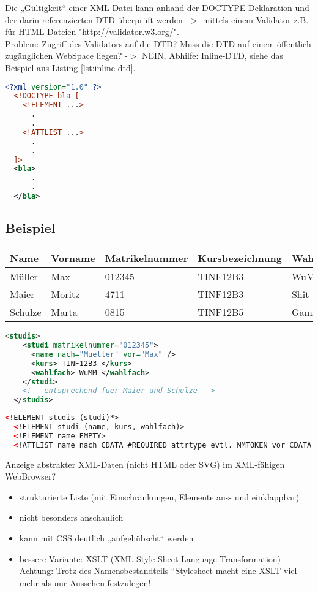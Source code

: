 \newpage
Die „Gültigkeit“ einer XML-Datei kann anhand der DOCTYPE-Deklaration und der darin referenzierten DTD überprüft werden -$>$ mittels einem Validator z.B. für HTML-Dateien "http://validator.w3.org/".\\
Problem: Zugriff des Validators auf die DTD? Muss die DTD auf einem öffentlich zugänglichen WebSpace liegen? -$>$ NEIN, Abhilfe: Inline-DTD, siehe das Beispiel aus Listing \vref{lst:inline-dtd}.
\begin{lstlisting}[caption={Inline-DTD Beispiel}, label={lst:inline-dtd}, language={XML}]
  <?xml version="1.0" ?>
  <!DOCTYPE bla [
    <!ELEMENT ...>
      .
      .
    <!ATTLIST ...>
      .
      .
  ]>
  <bla>
      .     
      .
  </bla> 
\end{lstlisting}

\newpage
\subsection{Beispiel}
\begin{tabular}{l|l|l|l|l}
\textbf{Name}	& \textbf{Vorname}	& \textbf{Matrikelnummer}	& \textbf{Kursbezeichnung}	& \textbf{Wahlfach}\\\hline
Müller	& Max		& 012345	& TINF12B3	& WuMBasis\\
Maier	& Moritz	& 4711		& TINF12B3	& Shit\\
Schulze	& Marta		& 0815		& TINF12B5	& Gaming\\
\end{tabular}	

\begin{lstlisting}[caption={Listeneinträge}, label={lst:inline-dtd}, language={XML}]
  <studis>
    <studi matrikelnummer="012345">
      <name nach="Mueller" vor="Max" />
      <kurs> TINF12B3 </kurs>
      <wahlfach> WuMM </wahlfach>
    </studi>
    <!-- entsprechend fuer Maier und Schulze -->
  </studis>
\end{lstlisting}

\begin{lstlisting}[caption={Baumerstellung per !ELEMENT}, label={lst:inline-dtd}, language={XML}]
  <!ELEMENT studis (studi)*>
  <!ELEMENT studi (name, kurs, wahlfach)>
  <!ELEMENT name EMPTY>
  <!ATTLIST name nach CDATA #REQUIRED attrtype evtl. NMTOKEN vor CDATA #REQUIRED attrtype evtl. NMTOKENS>
\end{lstlisting}

Anzeige abstrakter XML-Daten (nicht HTML oder SVG) im XML-fähigen WebBrowser?
\begin{itemize}
\item strukturierte Liste (mit Einschränkungen, Elemente aus- und einklappbar)
\item nicht besonders anschaulich
\item kann mit CSS deutlich „aufgehübscht“ werden
\item bessere Variante: XSLT (XML Style Sheet Language Transformation)\\
Achtung: Trotz des Namensbestandteils “Stylesheet macht eine XSLT viel mehr als nur Aussehen festzulegen!
\end{itemize}